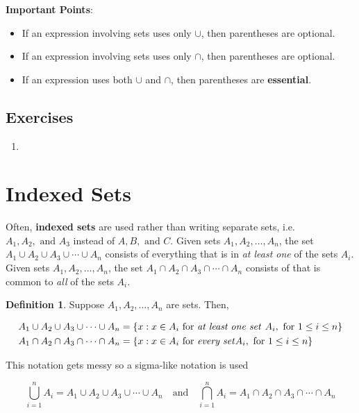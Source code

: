 \documentclass[10pt]{article}
\theoremstyle{definition}
\newtheorem{definition}{Definition}
\begin{document}
    \textbf{Important Points}:
    \begin{itemize}
        \item If an expression involving sets uses only $\cup$, then parentheses are optional.
        \item If an expression involving sets uses only $\cap$, then parentheses are optional.
        \item If an expression uses both $\cup$ and $\cap$, then parentheses are \textbf{essential}.
    \end{itemize}

    \subsection*{Exercises}
    \begin{enumerate}
        \item
    \end{enumerate}

    \section{Indexed Sets}
    Often, \textbf{indexed sets} are used rather than writing separate sets, i.e. $A_1, A_2, \text{ and } A_3$ instead of $A, B, \text{ and } C$.
    Given sets $A_1, A_2, \dots, A_n$, the set $A_1 \cup A_2 \cup A_3 \cup \cdots \cup A_n$ consists of everything that is in \textit{at least one} of the sets $A_i$.
    Given sets $A_1, A_2, \dots, A_n$, the set $A_1 \cap A_2 \cap A_3 \cap \cdots \cap A_n$ consists of that is common to \textit{all} of the sets $A_i$.

    \begin{definition}
        Suppose $A_1, A_2,\dots,A_n$ are sets. Then,

        $$
        \begin{aligned}
            A_1 \cup A_2 \cup A_3 \cup \cdots \cup A_n &= \{x: x\in A_i \text{ for \textit{at least one set }} A_i, \text{ for } 1 \leq i \leq n\} \\
            A_1 \cap A_2 \cap A_3 \cap \cdots \cap A_n &= \{x: x\in A_i \text{ for \textit{every set}} A_i, \text{ for } 1 \leq i \leq n\}
        \end{aligned}
        $$
    \end{definition}

    This notation gets messy so a sigma-like notation is used

    $$
    \bigcup_{i=1}^{n} A_i = A_1 \cup A_2 \cup A_3 \cup \cdots \cup A_n \quad \text{and} \quad
    \bigcap_{i=1}^{n} A_i = A_1 \cap A_2 \cap A_3 \cap \cdots \cap A_n
    $$
\end{document}
